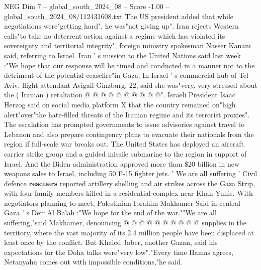 \begin{textsample}{NEG Dim 7 – global\_south\_2024\_08 – Score -1.00 – global\_south\_2024\_08/112431608.txt}
The US president added that while negotiations were"getting hard", he was"not giving up".
Iran rejects Western calls"to take no deterrent action against a regime which has violated its sovereignty and territorial integrity", foreign ministry spokesman Nasser Kanani said, referring to Israel.
Iran ' s mission to the United Nations said last week :"We hope that our response will be timed and conducted in a manner not to the detriment of the potential ceasefire"in Gaza.
In Israel ' s commercial hub of Tel Aviv, flight attendant Avigail Ginzburg, 22, said she was"very, very stressed about the ( Iranian ) retaliation @ @ @ @ @ @ @ @ @ @".
Israeli President Isaac Herzog said on social media platform X that the country remained on"high alert"over"the hate-filled threats of the Iranian regime and its terrorist proxies".
The escalation has prompted governments to issue advisories against travel to Lebanon and also prepare contingency plans to evacuate their nationals from the region if full-scale war breaks out.
The United States has deployed an aircraft carrier strike group and a guided missile submarine to the region in support of Israel.
And the Biden administration approved more than \$20 billion in new weapons sales to Israel, including 50 F-15 fighter jets. ' We are all suffering ' Civil defence \textbf{rescuers} reported artillery shelling and air strikes across the Gaza Strip, with four family members killed in a residential complex near Khan Yunis.
With negotiators planning to meet, Palestinian Ibrahim Makhamer Said in central Gaza ' s Deir Al Balah :"We hope for the end of the war.""We are all suffering,"said Makhamer, denouncing @ @ @ @ @ @ @ @ @ @ supplies in the territory, where the vast majority of its 2.4 million people have been displaced at least once by the conflict.
But Khaled Jaber, another Gazan, said his expectations for the Doha talks were"very low"."Every time Hamas agrees, Netanyahu comes out with impossible conditions,"he said.

\end{textsample}
